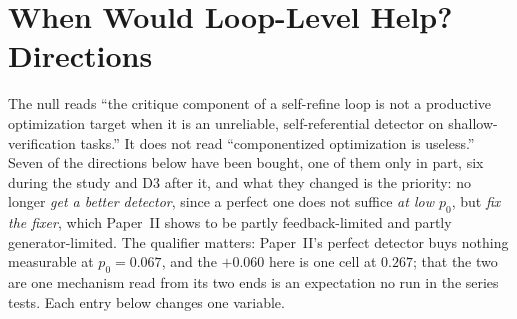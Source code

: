 \documentclass[11pt]{article}
\begin{document}
\FloatBarrier

\section{When Would Loop-Level Help? Directions}
\label{sec:directions}

The null reads ``the critique component of a
self-refine loop is not a productive optimization target when it is an unreliable,
self-referential detector on shallow-verification tasks.'' It does not read ``componentized
optimization is useless.'' Seven of the directions below have been
bought, one of them only in part, six during the study and D3 after it, and what they
changed is the priority: no longer \emph{get a better
detector}, since a perfect one does not suffice \emph{at low $p_0$}, but \emph{fix the fixer},
which Paper~II
shows to be partly feedback-limited and partly generator-limited. The qualifier matters: Paper~II's
perfect detector buys nothing measurable at $p_0 = 0.067$, and the $+0.060$ here is one cell at
$0.267$; that the two are one mechanism read from its two ends is an expectation no run in the
series tests. Each entry below changes one variable.
\end{document}
